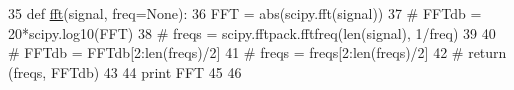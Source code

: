 \begin{DoxyCode}
35 \textcolor{keyword}{def }\hyperlink{namespacesoftware_1_1chipwhisperer_1_1analyzer_1_1preprocessing_1_1DecimationClockRecovery_a071ed626482b2e73cba96afc1ce80942}{fft}(signal, freq=None):
36     FFT = abs(scipy.fft(signal))
37     \textcolor{comment}{# FFTdb = 20*scipy.log10(FFT)}
38     \textcolor{comment}{# freqs = scipy.fftpack.fftfreq(len(signal), 1/freq)}
39 
40     \textcolor{comment}{# FFTdb = FFTdb[2:len(freqs)/2]}
41     \textcolor{comment}{# freqs = freqs[2:len(freqs)/2]}
42     \textcolor{comment}{# return (freqs, FFTdb)}
43 
44     \textcolor{keywordflow}{print} FFT
45 
46 
\end{DoxyCode}
